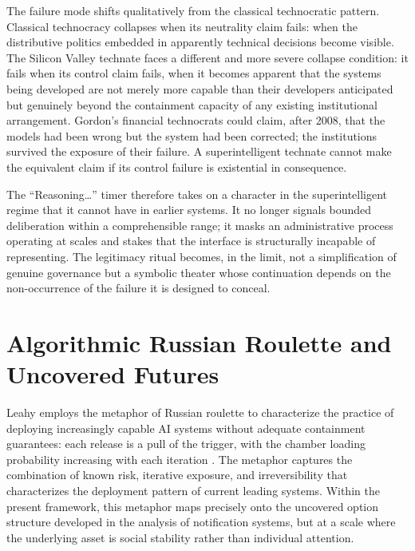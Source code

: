 \documentclass[12pt]{article}
\begin{document}
The failure mode shifts qualitatively from the classical technocratic pattern. Classical technocracy collapses when its neutrality claim fails: when the distributive politics embedded in apparently technical decisions become visible. The Silicon Valley technate faces a different and more severe collapse condition: it fails when its control claim fails, when it becomes apparent that the systems being developed are not merely more capable than their developers anticipated but genuinely beyond the containment capacity of any existing institutional arrangement. Gordon's financial technocrats could claim, after 2008, that the models had been wrong but the system had been corrected; the institutions survived the exposure of their failure. A superintelligent technate cannot make the equivalent claim if its control failure is existential in consequence.

The ``Reasoning\ldots'' timer therefore takes on a character in the superintelligent regime that it cannot have in earlier systems. It no longer signals bounded deliberation within a comprehensible range; it masks an administrative process operating at scales and stakes that the interface is structurally incapable of representing. The legitimacy ritual becomes, in the limit, not a simplification of genuine governance but a symbolic theater whose continuation depends on the non-occurrence of the failure it is designed to conceal.

\section{Algorithmic Russian Roulette and Uncovered Futures}

Leahy employs the metaphor of Russian roulette to characterize the practice of deploying increasingly capable AI systems without adequate containment guarantees: each release is a pull of the trigger, with the chamber loading probability increasing with each iteration \citep{Leahy2024}. The metaphor captures the combination of known risk, iterative exposure, and irreversibility that characterizes the deployment pattern of current leading systems. Within the present framework, this metaphor maps precisely onto the uncovered option structure developed in the analysis of notification systems, but at a scale where the underlying asset is social stability rather than individual attention.
\end{document}
